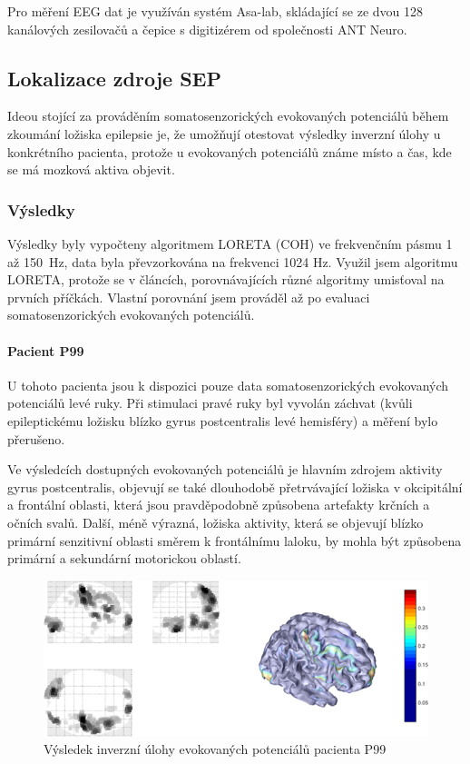 Pro měření EEG dat je využíván systém Asa-lab, skládající se ze dvou 128 kanálových zesilovačů a čepice s digitizérem od společnosti ANT Neuro. \cite{67}

\subsection{Lokalizace zdroje SEP}
Ideou stojící za prováděním somatosenzorických evokovaných potenciálů během zkoumání ložiska epilepsie je, že umožňují otestovat výsledky inverzní úlohy u konkrétního pacienta, protože u evokovaných potenciálů známe místo a čas, kde se má mozková aktiva objevit.

\subsubsection{Výsledky}
Výsledky byly vypočteny algoritmem LORETA (COH) ve frekvenčním pásmu 1 až 150~Hz, data byla převzorkována na frekvenci 1024 Hz. Využil jsem algoritmu LORETA, protože se v článcích, porovnávajících různé algoritmy umisťoval na prvních příčkách. Vlastní porovnání jsem prováděl až po evaluaci somatosenzorických evokovaných potenciálů.


\paragraph{Pacient P99}
U tohoto pacienta jsou k dispozici pouze data somatosenzorických evokovaných potenciálů levé ruky. Při stimulaci pravé ruky byl vyvolán záchvat (kvůli epileptickému ložisku blízko gyrus postcentralis levé hemisféry) a měření bylo přerušeno.

Ve výsledcích dostupných evokovaných potenciálů je hlavním zdrojem aktivity gyrus postcentralis, objevují se také dlouhodobě přetrvávající ložiska v okcipitální a frontální oblasti, která jsou pravděpodobně způsobena artefakty krčních a očních svalů. Další, méně výrazná, ložiska aktivity, která se objevují blízko primární senzitivní oblasti směrem k frontálnímu laloku, by mohla být způsobena primární a sekundární motorickou oblastí.
\begin{figure}[!h]
\includegraphics[width=1.0\textwidth]{casti/aplikace/sep/P99.png}
\caption{Výsledek inverzní úlohy evokovaných potenciálů pacienta P99}
\end{figure}

